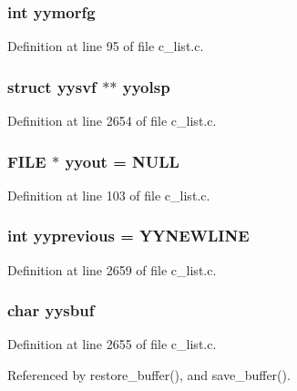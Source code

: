 \subsubsection{\setlength{\rightskip}{0pt plus 5cm}int \bf{yymorfg}}\label{c__list_8c_36702dc8caf59c02fba363377b123171}




Definition at line 95 of file c\_\-list.c.
\subsubsection{\setlength{\rightskip}{0pt plus 5cm}struct \bf{yysvf} $\ast$$\ast$ \bf{yyolsp}}\label{c__list_8c_ee96721f15c2dbe2efd58f2b9186a801}




Definition at line 2654 of file c\_\-list.c.
\subsubsection{\setlength{\rightskip}{0pt plus 5cm}FILE $\ast$ \bf{yyout} = NULL}\label{c__list_8c_296847b42b0baa62e2af36cb79f3c0eb}




Definition at line 103 of file c\_\-list.c.
\subsubsection{\setlength{\rightskip}{0pt plus 5cm}int \bf{yyprevious} = YYNEWLINE}\label{c__list_8c_c38b368bcd0914edeacaf81bb7ac17f8}




Definition at line 2659 of file c\_\-list.c.
\subsubsection{\setlength{\rightskip}{0pt plus 5cm}char \bf{yysbuf}}\label{c__list_8c_e8fbdb4e6e0a20447137ec1313c59e4c}




Definition at line 2655 of file c\_\-list.c.

Referenced by restore\_\-buffer(), and save\_\-buffer().
